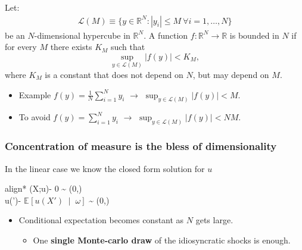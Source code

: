 \documentclass[aspectratio=169,10pt]{beamer}
\newcommand{\emphcolor}[1]{\textbf{\textcolor{emphcolorval}{#1}}}
\newcommand{\condexpec}[3][]{\ensuremath{\mathbb{E}_{#1}\left[{#2} \; \middle| \; {#3} \right]}}
\begin{document}
\begin{frame}
	\begin{definition}
		Let:
		\begin{align*}
			\mathcal{L}(M) \equiv \{y \in \mathbb{R}^N: |y_i|\leq M ~\forall i = 1,\dots,N\}
		\end{align*}
	be an $N$-dimensional hypercube in $\mathbb{R}^N$. A function $f: \mathbb{R}^N\rightarrow \mathbb{R}$ is bounded in $N$ if for every $M$ there exists $K_M$ such that 
	\begin{equation*}
		\sup_{y\in \mathcal{L}(M)} |f(y)| < K_M,
	\end{equation*}
	where $K_M$ is a constant that does not depend on $N$, but may depend on $M$.
	\end{definition}
\begin{itemize}
	\item Example $f(y) = \frac{1}{N}\sum_{i=1}^N y_i$ $\rightarrow$ $\sup_{y\in \mathcal{L}(M)} |f(y)| < M$.\vspace{0.1in}
	\item To avoid $f(y) = \sum_{i=1}^N y_i$ $\rightarrow$ $\sup_{y\in \mathcal{L}(M)} |f(y)| < NM$.
\end{itemize}
\hyperlink{concentration}{}
\end{frame}

\begin{frame}[label = errors]
	\frametitle{Concentration of measure is the bless of dimensionality}
	In the linear case we know the closed form solution for $u$
	\begin{empheq}[box=\tcbhighmath]{align*}
		\hat{\varepsilon}\left(X;u\right)- 0 \sim {} \left(0,\right)\\
		u(')- \condexpec{u(X')}{\omega} \sim {} \left(0,\right)
	\end{empheq}
	\begin{itemize}
		\item Conditional expectation becomes constant as $N$ gets large.\vspace{0.1in}
		\begin{itemize}
			\item One \emphcolor{single Monte-carlo draw} of the idiosyncratic shocks is enough.\vspace{0.1in}
			\end{itemize}
	\end{itemize}
\hyperlink{algo}{}
\end{frame}
\end{document}
